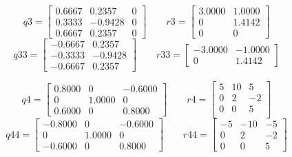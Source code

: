 \documentclass[UTF8]{ctexart}
\begin{document}
$$q3=\begin{bmatrix}
	
0.6667  &  0.2357     &    0\\
0.3333  & -0.9428      &   0\\
0.6667  &  0.2357     &    0

\end{bmatrix}\qquad
r3= \begin{bmatrix}
	 3.0000   & 1.0000\\
	0   & 1.4142\\
	0    &     0
	
\end{bmatrix} $$
$$q33 =\begin{bmatrix}
-0.6667  &  0.2357\\
-0.3333   &-0.9428\\
-0.6667  &  0.2357
	
\end{bmatrix}\qquad
r33=\begin{bmatrix}	
	 -3.0000  & -1.0000\\
	0   & 1.4142
\end{bmatrix}$$    

$$q4=\begin{bmatrix}
	
  0.8000     &    0  & -0.6000\\
0   & 1.0000    &     0\\
0.6000     &    0  &  0.8000
	
\end{bmatrix}\qquad
r4= \begin{bmatrix}
5  &  10   &  5\\
0   &  2  &  -2\\
0   &  0  &   5\\
	
\end{bmatrix} $$
$$q44 =\begin{bmatrix}
	-0.8000      &   0 &  -0.6000\\
	0  &  1.0000     &    0\\
	-0.6000   &      0 &   0.8000	
\end{bmatrix}\qquad
r44=\begin{bmatrix}	
 -5  & -10   & -5\\
0   &  2   & -2\\
0   &  0  &   5
\end{bmatrix}$$    
\end{document}
